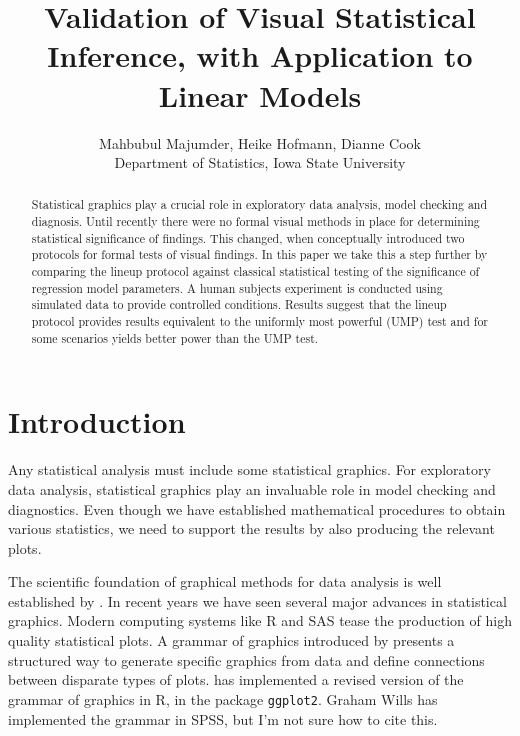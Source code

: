 \documentclass{article}
\newcommand{\blue}[1]{{\color{blue} #1}}
\begin{document}
\title{Validation of Visual Statistical Inference, with Application to Linear Models}
\author{Mahbubul Majumder, Heike Hofmann, Dianne Cook\\
        Department of Statistics, Iowa State University}
\maketitle

\begin {abstract} 
Statistical graphics play a crucial role in exploratory data analysis, model checking and diagnosis. Until recently there were no formal visual methods in place for determining statistical significance of findings. This changed, when \citet{buja:2009} conceptually introduced two protocols for formal tests of visual findings. In this paper we take this a step further by comparing the lineup protocol \citep{buja:2009} against classical statistical testing  of the significance of regression model parameters. A human subjects experiment is conducted using simulated data to provide controlled conditions. Results suggest that the lineup protocol provides results equivalent to the uniformly most powerful (UMP) test and for some scenarios yields better power than the UMP test.
\end {abstract}


\section{Introduction} 

Any statistical analysis must include some statistical graphics. For exploratory data analysis, statistical graphics play an invaluable role in model checking and diagnostics. Even though we have established mathematical procedures to obtain various statistics, we need to support the results by also producing the relevant plots. 

The scientific foundation of graphical methods for data analysis is well established by \cite{cleveland:1984}. In recent years we have seen several major advances in statistical graphics. Modern computing systems like R and SAS tease the production of high quality statistical plots. A grammar of graphics introduced by \cite{wilkinson:1999} presents a structured way to generate specific graphics from data and define connections between disparate types of plots.  \cite{hadley:2009} has implemented a revised version of the grammar of graphics in R, in the package {\tt ggplot2}.   \blue {Graham Wills has implemented the grammar in SPSS, but I'm not sure how to cite this.}
\end{document}
